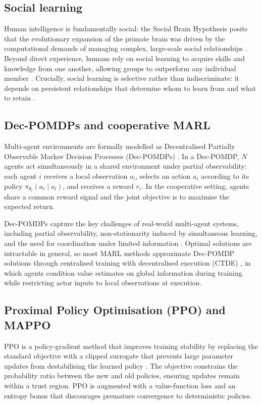 \documentclass{article}
\theoremstyle{plain}
\theoremstyle{definition}
\theoremstyle{remark}
\begin{document}
\subsection*{Social learning}
Human intelligence is fundamentally social: the Social Brain Hypothesis posits that the evolutionary expansion of the primate brain was driven by the computational demands of managing complex, large-scale social relationships \cite{dunbar1998social}. Beyond direct experience, humans rely on social learning to acquire skills and knowledge from one another, allowing groups to outperform any individual member \cite{tomasello1993cultural, boyd2011cultural}. Crucially, social learning is selective rather than indiscriminate: it depends on persistent relationships that determine whom to learn from and what to retain \cite{kendal2018social}.

\subsection*{Dec-POMDPs and cooperative MARL}
Multi-agent environments are formally modelled as Decentralised Partially Observable Markov Decision Processes (Dec-POMDPs) \cite{bernstein2002complexity}. In a Dec-POMDP, $N$ agents act simultaneously in a shared environment under partial observability: each agent $i$ receives a local observation $o_i$, selects an action $a_i$ according to its policy $\pi_{\theta_i}(a_i \mid o_i)$, and receives a reward $r_i$. In the cooperative setting, agents share a common reward signal and the joint objective is to maximise the expected return.

Dec-POMDPs capture the key challenges of real-world multi-agent systems, including partial observability, non-stationarity induced by simultaneous learning, and the need for coordination under limited information \cite{wong2023deep}. Optimal solutions are intractable in general, so most MARL methods approximate Dec-POMDP solutions through centralised training with decentralised execution (CTDE) \cite{amato2015scalable}, in which agents condition value estimates on global information during training while restricting actor inputs to local observations at execution.

\subsection*{Proximal Policy Optimisation (PPO) and MAPPO}
PPO is a policy-gradient method that improves training stability by replacing the standard objective with a clipped surrogate that prevents large parameter updates from destabilising the learned policy \cite{yu2022surprising}. The objective constrains the probability ratio between the new and old policies, ensuring updates remain within a trust region. PPO is augmented with a value-function loss and an entropy bonus that discourages premature convergence to deterministic policies.
\end{document}
